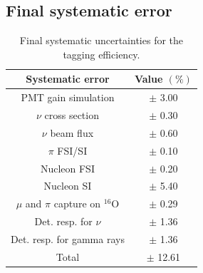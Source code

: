 \newpage


\subsection{Final systematic error}

\begin{table}[htb!]
\centering
\begin{tabular}{||cc||}
    \hline Systematic error & Value $(\%)$ \\
    \hline PMT gain simulation & $\pm$ 3.00 \\
    $\nu$ cross section & $\pm$ 0.30 \\
    $\nu$ beam flux & $\pm$ 0.60 \\
    $\pi$ FSI/SI & $\pm$ 0.10 \\
    Nucleon FSI & $\pm$ 0.20 \\
    Nucleon SI & $\pm$ 5.40 \\
    $\mu$ and $\pi$ capture on ${ }^{16} \mathrm{O}$ & $\pm$ 0.29 \\
    Det. resp. for $\nu$ & $\pm$ 1.36 \\
    Det. resp. for gamma rays & $\pm$ 1.36 \\
    \hline
    Total & $\pm$ 12.61 \\
    \hline
    \end{tabular}
\caption{Final systematic uncertainties for the tagging efficiency.} 
\label{table:systuncertaintytable}
\end{table}


